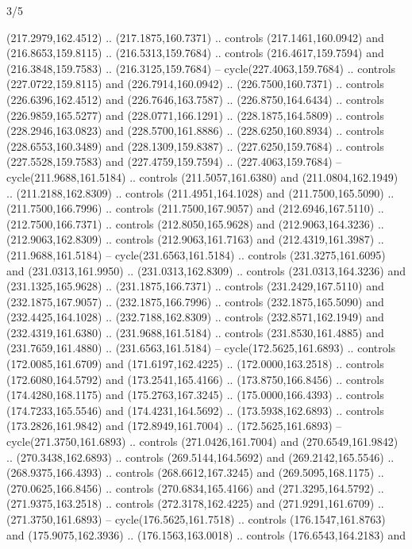 \begin{flagdescription}{3/5}
\begin{scope}[scale=0.00214\flagwidth,yshift=162mm]
\begin{scope}[y=-0.8pt, x=0.8pt, inner sep=0pt, outer sep=0pt]
\begin{scope}[draw,fill=gold,line join=round,line cap=round,line width=0.0025\flagwidth]
\begin{scope}[line width=0.0025\flagwidth]
(217.2979,162.4512) .. (217.1875,160.7371) .. controls (217.1461,160.0942) and
(216.8653,159.8115) .. (216.5313,159.7684) .. controls (216.4617,159.7594) and
(216.3848,159.7583) .. (216.3125,159.7684) -- cycle(227.4063,159.7684) ..
controls (227.0722,159.8115) and (226.7914,160.0942) .. (226.7500,160.7371) ..
controls (226.6396,162.4512) and (226.7646,163.7587) .. (226.8750,164.6434) ..
controls (226.9859,165.5277) and (228.0771,166.1291) .. (228.1875,164.5809) ..
controls (228.2946,163.0823) and (228.5700,161.8886) .. (228.6250,160.8934) ..
controls (228.6553,160.3489) and (228.1309,159.8387) .. (227.6250,159.7684) ..
controls (227.5528,159.7583) and (227.4759,159.7594) .. (227.4063,159.7684) --
cycle(211.9688,161.5184) .. controls (211.5057,161.6380) and
(211.0804,162.1949) .. (211.2188,162.8309) .. controls (211.4951,164.1028) and
(211.7500,165.5090) .. (211.7500,166.7996) .. controls (211.7500,167.9057) and
(212.6946,167.5110) .. (212.7500,166.7371) .. controls (212.8050,165.9628) and
(212.9063,164.3236) .. (212.9063,162.8309) .. controls (212.9063,161.7163) and
(212.4319,161.3987) .. (211.9688,161.5184) -- cycle(231.6563,161.5184) ..
controls (231.3275,161.6095) and (231.0313,161.9950) .. (231.0313,162.8309) ..
controls (231.0313,164.3236) and (231.1325,165.9628) .. (231.1875,166.7371) ..
controls (231.2429,167.5110) and (232.1875,167.9057) .. (232.1875,166.7996) ..
controls (232.1875,165.5090) and (232.4425,164.1028) .. (232.7188,162.8309) ..
controls (232.8571,162.1949) and (232.4319,161.6380) .. (231.9688,161.5184) ..
controls (231.8530,161.4885) and (231.7659,161.4880) .. (231.6563,161.5184) --
cycle(172.5625,161.6893) .. controls (172.0085,161.6709) and
(171.6197,162.4225) .. (172.0000,163.2518) .. controls (172.6080,164.5792) and
(173.2541,165.4166) .. (173.8750,166.8456) .. controls (174.4280,168.1175) and
(175.2763,167.3245) .. (175.0000,166.4393) .. controls (174.7233,165.5546) and
(174.4231,164.5692) .. (173.5938,162.6893) .. controls (173.2826,161.9842) and
(172.8949,161.7004) .. (172.5625,161.6893) -- cycle(271.3750,161.6893) ..
controls (271.0426,161.7004) and (270.6549,161.9842) .. (270.3438,162.6893) ..
controls (269.5144,164.5692) and (269.2142,165.5546) .. (268.9375,166.4393) ..
controls (268.6612,167.3245) and (269.5095,168.1175) .. (270.0625,166.8456) ..
controls (270.6834,165.4166) and (271.3295,164.5792) .. (271.9375,163.2518) ..
controls (272.3178,162.4225) and (271.9291,161.6709) .. (271.3750,161.6893) --
cycle(176.5625,161.7518) .. controls (176.1547,161.8763) and
(175.9075,162.3936) .. (176.1563,163.0018) .. controls (176.6543,164.2183) and

\end{scope}
\end{scope}
\end{scope}
\end{scope}
\end{flagdescription}
